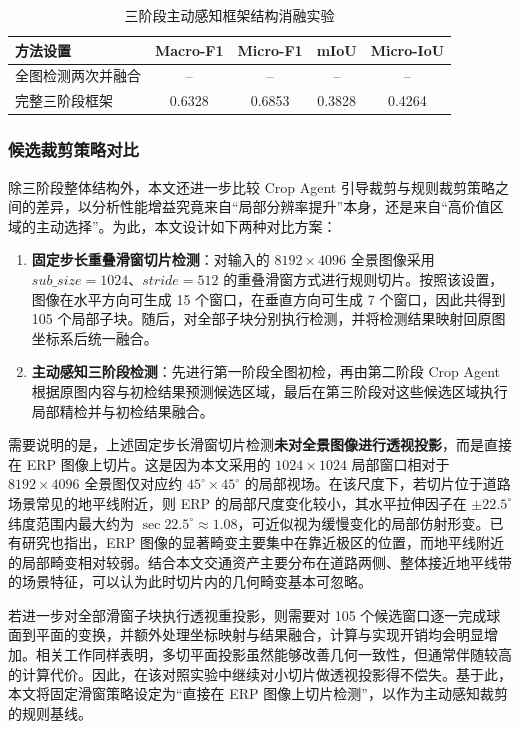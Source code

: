 \begin{table}[htbp]
    \centering
    \caption{三阶段主动感知框架结构消融实验}
    \label{tab:ablation_framework}
    \begin{tabular}{lcccc}
        \toprule
        方法设置 & Macro-F1 & Micro-F1 & mIoU & Micro-IoU \\
        \midrule
        全图检测两次并融合 & -- & -- & -- & -- \\
        完整三阶段框架 & 0.6328 & 0.6853 & 0.3828 & 0.4264 \\
        \bottomrule
    \end{tabular}
\end{table}

\subsubsection{候选裁剪策略对比}

除三阶段整体结构外，本文还进一步比较 Crop Agent 引导裁剪与规则裁剪策略之间的差异，以分析性能增益究竟来自“局部分辨率提升”本身，还是来自“高价值区域的主动选择”。为此，本文设计如下两种对比方案：
\begin{enumerate}
    \item \textbf{固定步长重叠滑窗切片检测}：对输入的 $8192\times 4096$ 全景图像采用 $sub\_size=1024$、$stride=512$ 的重叠滑窗方式进行规则切片。按照该设置，图像在水平方向可生成 15 个窗口，在垂直方向可生成 7 个窗口，因此共得到 105 个局部子块。随后，对全部子块分别执行检测，并将检测结果映射回原图坐标系后统一融合。
    \item \textbf{主动感知三阶段检测}：先进行第一阶段全图初检，再由第二阶段 Crop Agent 根据原图内容与初检结果预测候选区域，最后在第三阶段对这些候选区域执行局部精检并与初检结果融合。
\end{enumerate}

需要说明的是，上述固定步长滑窗切片检测\textbf{未对全景图像进行透视投影}，而是直接在 ERP 图像上切片。这是因为本文采用的 $1024\times1024$ 局部窗口相对于 $8192\times4096$ 全景图仅对应约 $45^\circ\times45^\circ$ 的局部视场。在该尺度下，若切片位于道路场景常见的地平线附近，则 ERP 的局部尺度变化较小，其水平拉伸因子在 $\pm22.5^\circ$ 纬度范围内最大约为 $\sec 22.5^\circ \approx 1.08$，可近似视为缓慢变化的局部仿射形变。已有研究也指出，ERP 图像的显著畸变主要集中在靠近极区的位置，而地平线附近的局部畸变相对较弱\cite{yang2018equirectangular_detection,wang2022landmarks}。结合本文交通资产主要分布在道路两侧、整体接近地平线带的场景特征，可以认为此时切片内的几何畸变基本可忽略。

若进一步对全部滑窗子块执行透视重投影，则需要对 105 个候选窗口逐一完成球面到平面的变换，并额外处理坐标映射与结果融合，计算与实现开销均会明显增加。相关工作同样表明，多切平面投影虽然能够改善几何一致性，但通常伴随较高的计算代价\cite{zhang2018saliency360,su2019ktn}。因此，在该对照实验中继续对小切片做透视投影得不偿失。基于此，本文将固定滑窗策略设定为“直接在 ERP 图像上切片检测”，以作为主动感知裁剪的规则基线。

